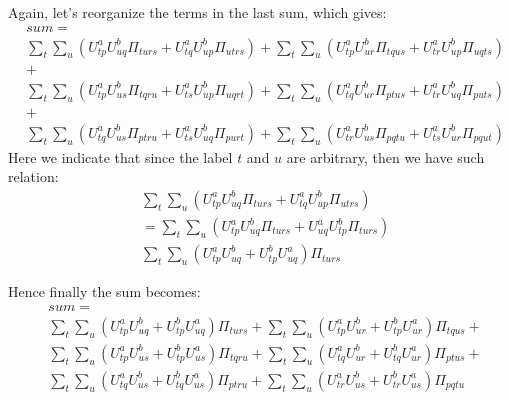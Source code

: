 Again, let's reorganize the terms in the last sum, which gives:
\begin{equation}
 \begin{split}
&sum =\\
&\sum_{t}\sum_{u}
\left( U^{a}_{tp}U^{b}_{uq}\Pi_{turs} + 
U^{a}_{tq}U^{b}_{up}\Pi_{utrs}\right) 
+\sum_{t}\sum_{u}
\left( U^{a}_{tp}U^{b}_{ur}\Pi_{tqus} + 
U^{a}_{tr}U^{b}_{up}\Pi_{uqts}\right)\\
& +\\ 
&\sum_{t}\sum_{u}
\left(U^{a}_{tp}U^{b}_{us}\Pi_{tqru}  +
U^{a}_{ts}U^{b}_{up}\Pi_{uqrt}\right) 
+\sum_{t}\sum_{u}
\left(U^{a}_{tq}U^{b}_{ur}\Pi_{ptus}  +
U^{a}_{tr}U^{b}_{uq}\Pi_{puts}\right) \\   
&+\\
&\sum_{t}\sum_{u}
\left(U^{a}_{tq}U^{b}_{us}\Pi_{ptru}  +
U^{a}_{ts}U^{b}_{uq}\Pi_{purt}\right)  
+\sum_{t}\sum_{u}
\left(U^{a}_{tr}U^{b}_{us}\Pi_{pqtu}  +
U^{a}_{ts}U^{b}_{ur}\Pi_{pqut}\right) 
\end{split}
\label{two_electron_MO_INT_gradient_eq:12}
\end{equation}
Here we indicate that since the label $t$ and $u$ are arbitrary, then we have
such relation:
\begin{align}
& \sum_{t}\sum_{u}
\left( U^{a}_{tp}U^{b}_{uq}\Pi_{turs} + 
U^{a}_{tq}U^{b}_{up}\Pi_{utrs}\right)   \nonumber \\
&=
\sum_{t}\sum_{u}
\left( U^{a}_{tp}U^{b}_{uq}\Pi_{turs} + 
U^{a}_{uq}U^{b}_{tp}\Pi_{turs}\right)  \nonumber  \\
&\sum_{t}\sum_{u}
\left( 
U^{a}_{tp}U^{b}_{uq} + 
U^{b}_{tp}U^{a}_{uq}
\right) \Pi_{turs}
\end{align}

Hence finally the sum becomes:
\begin{equation}
 \begin{split}
&sum =\\
&\sum_{t}\sum_{u}
\left(U^{a}_{tp}U^{b}_{uq} + 
U^{b}_{tp}U^{a}_{uq}\right) \Pi_{turs}
+\sum_{t}\sum_{u}
\left(U^{a}_{tp}U^{b}_{ur} + 
U^{b}_{tp}U^{a}_{ur}\right)\Pi_{tqus}   +\\ 
&\sum_{t}\sum_{u}
\left(U^{a}_{tp}U^{b}_{us} +
U^{b}_{tp}U^{a}_{us}\right) \Pi_{tqru}
+\sum_{t}\sum_{u}
\left(U^{a}_{tq}U^{b}_{ur}  +
U^{b}_{tq}U^{a}_{ur}\right)\Pi_{ptus}    +\\
&\sum_{t}\sum_{u}
\left(U^{a}_{tq}U^{b}_{us}  +
U^{b}_{tq}U^{a}_{us}\right)\Pi_{ptru}  
+\sum_{t}\sum_{u}
\left(U^{a}_{tr}U^{b}_{us}  +
U^{b}_{tr}U^{a}_{us}\right)\Pi_{pqtu} 
\end{split}
\label{two_electron_MO_INT_gradient_eq:13}
\end{equation} 

